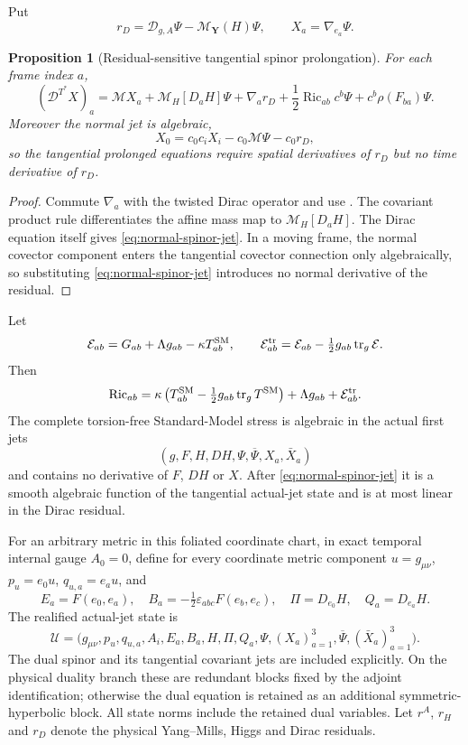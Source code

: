 \documentclass[11pt]{article}
\numberwithin{equation}{section}
\newtheorem{proposition}[proposition]{Proposition}
\theoremstyle{definition}
\theoremstyle{remark}
\newcommand{\Ric}{\operatorname{Ric}}
\newcommand{\bPsi}{\overline\Psi}
\begin{document}
Put
\[
 r_D=\mathscr D_{g,A}\Psi-\mathscr M_{\boldsymbol Y}(H)\Psi,
 \qquad X_a=\nabla_{e_a}\Psi.
\]
\begin{proposition}[Residual-sensitive tangential spinor prolongation]
\label{prop:spinor-prolongation}
For each frame index $a$,
\begin{equation}
 (\mathscr D^{T^*}X)_a
 =\mathscr M X_a+\mathscr M_H[D_aH]\Psi+\nabla_a r_D
 +\frac12\Ric_{ab}c^b\Psi+c^b\rho(F_{ba})\Psi.
 \label{eq:spinor-prolongation}
\end{equation}
Moreover the normal jet is algebraic,
\begin{equation}
 X_0=c_0c_iX_i-c_0\mathscr M\Psi-c_0r_D,
 \label{eq:normal-spinor-jet}
\end{equation}
so the tangential prolonged equations require spatial derivatives of $r_D$ but no time derivative of $r_D$.
\end{proposition}
\begin{proof}
Commute $\nabla_a$ with the twisted Dirac operator and use .  The covariant product rule differentiates the affine mass map to $\mathscr M_H[D_aH]$.  The Dirac equation itself gives \eqref{eq:normal-spinor-jet}.  In a moving frame, the normal covector component enters the tangential covector connection only algebraically, so substituting \eqref{eq:normal-spinor-jet} introduces no normal derivative of the residual.
\end{proof}

Let
\[
 \mathcal E_{ab}=G_{ab}+\Lambda g_{ab}-\kappa T^{\rm SM}_{ab},
 \qquad
 \mathcal E^{\rm tr}_{ab}=\mathcal E_{ab}-\tfrac12g_{ab}\operatorname{tr}_g\mathcal E.
\]
Then
\begin{equation}
 \Ric_{ab}=\kappa\left(T^{\rm SM}_{ab}-\tfrac12g_{ab}\operatorname{tr}_gT^{\rm SM}\right)
 +\Lambda g_{ab}+\mathcal E^{\rm tr}_{ab}.
 \label{eq:trace-reversal-residual}
\end{equation}
The complete torsion-free Standard-Model stress is algebraic in the actual first jets
\[
 (g,F,H,DH,\Psi,\bPsi,X_a,\bar X_a)
\]
and contains no derivative of $F$, $DH$ or $X$.  After \eqref{eq:normal-spinor-jet} it is a smooth algebraic function of the tangential actual-jet state and is at most linear in the Dirac residual.

For an arbitrary metric in this foliated coordinate chart, in exact temporal
internal gauge $A_0=0$, define for every coordinate metric component
$u=g_{\mu\nu}$,
$p_u=e_0u$, $q_{u,a}=e_au$, and
\[
 E_a=F(e_0,e_a),\quad B_a=-\tfrac12\varepsilon_{abc}F(e_b,e_c),
 \quad \Pi=D_{e_0}H,\quad Q_a=D_{e_a}H.
\]
The realified actual-jet state is
\begin{equation}
 \mathcal U=\bigl(g_{\mu\nu},p_u,q_{u,a},A_i,E_a,B_a,H,\Pi,Q_a,
                 \Psi,(X_a)_{a=1}^3,\bPsi,(\bar X_a)_{a=1}^3\bigr).
 \label{eq:actual-jet-state}
\end{equation}
The dual spinor and its tangential covariant jets are included explicitly.
On the physical duality branch these are redundant blocks fixed by the
adjoint identification; otherwise the dual equation is retained as an
additional symmetric-hyperbolic block. All state norms include the retained
dual variables.  Let $r^A$, $r_H$ and $r_D$ denote the physical Yang--Mills, Higgs and Dirac residuals.
\end{document}
